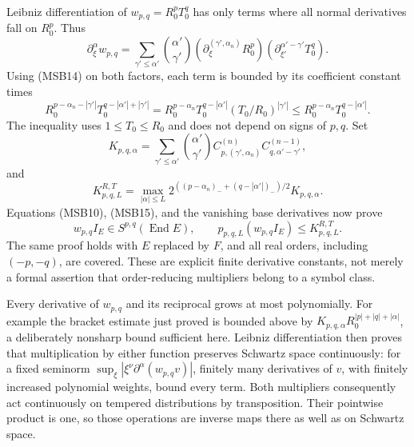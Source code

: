 \documentclass[
  11pt,
]{article}
\makeatletter
\let\ReaderOriginalAnchorStart\hyper@anchorstart
\let\ReaderOriginalAnchorEnd\hyper@anchorend
\let\ReaderPendingAliases\@empty
\def\ReaderArmAliases#1{\gdef\ReaderPendingAliases{#1}}
\def\hyper@anchorstart#1{\ReaderIfNativeAnchorTF{#1}{\ReaderPendingAliases\global\let\ReaderPendingAliases\@empty}{}\ReaderOriginalAnchorStart{#1}}
\makeatother
\begin{document}
Leibniz differentiation of \(w_{p,q}=R_0^pT_0^q\) has only terms where
all normal derivatives fall on \(R_0^p\). Thus \[
 \partial_\xi^\alpha w_{p,q}
 =\sum_{\gamma'\leq\alpha'}
    \binom{\alpha'}{\gamma'}
    (\partial_\xi^{(\gamma',\alpha_n)}R_0^p)
    (\partial_{\xi'}^{\alpha'-\gamma'}T_0^q).
 \tag{MSB15}
\] Using (MSB14) on both factors, each term is bounded by its
coefficient constant times \[
 R_0^{p-\alpha_n-|\gamma'|}
 T_0^{q-|\alpha'|+|\gamma'|}
 =R_0^{p-\alpha_n}T_0^{q-|\alpha'|}
       (T_0/R_0)^{|\gamma'|}
 \leq R_0^{p-\alpha_n}T_0^{q-|\alpha'|}.
\] The inequality uses \(1\leq T_0\leq R_0\) and does not depend on
signs of \(p,q\). Set \[
 K_{p,q,\alpha}=
 \sum_{\gamma'\leq\alpha'}\binom{\alpha'}{\gamma'}
 C^{(n)}_{p,(\gamma',\alpha_n)}
 C^{(n-1)}_{q,\alpha'-\gamma'},
\] and \[
 K_{p,q,L}^{R,T}=
 \max_{|\alpha|\leq L}
 2^{((p-\alpha_n)_-+(q-|\alpha'|)_-)/2}K_{p,q,\alpha}.
 \tag{MSB16}
\] Equations (MSB10), (MSB15), and the vanishing base derivatives now
prove \[
 w_{p,q}I_E\in S^{p,q}(\operatorname{End}E),
 \qquad p_{p,q,L}(w_{p,q}I_E)\leq K_{p,q,L}^{R,T}.
 \tag{MSB17}
\] The same proof holds with \(E\) replaced by \(F\), and all real
orders, including \((-p,-q)\), are covered. These are explicit finite
derivative constants, not merely a formal assertion that order-reducing
multipliers belong to a symbol class.

Every derivative of \(w_{p,q}\) and its reciprocal grows at most
polynomially. For example the bracket estimate just proved is bounded
above by \(K_{p,q,\alpha}R_0^{|p|+|q|+|\alpha|}\), a deliberately
nonsharp bound sufficient here. Leibniz differentiation then proves that
multiplication by either function preserves Schwartz space continuously:
for a fixed seminorm \(\sup_\xi|\xi^\nu\partial^\alpha(w_{p,q}v)|\),
finitely many derivatives of \(v\), with finitely increased polynomial
weights, bound every term. Both multipliers consequently act
continuously on tempered distributions by transposition. Their pointwise
product is one, so those operations are inverse maps there as well as on
Schwartz space.

\ReaderArmAliases{\ReaderOriginalAnchorStart{AN03-MSB-004}\ReaderOriginalAnchorEnd\begingroup\expandafter\def\csname @currentHref\endcsname{AN03-MSB-004}\label{AN03-MSB-004}\endgroup\ReaderOriginalAnchorStart{an03-msb-004-hilbert-spaces-exact-multiplier-domains-and-density}\ReaderOriginalAnchorEnd\begingroup\expandafter\def\csname @currentHref\endcsname{an03-msb-004-hilbert-spaces-exact-multiplier-domains-and-density}\label{an03-msb-004-hilbert-spaces-exact-multiplier-domains-and-density}\endgroup\ReaderOriginalAnchorStart{4-hilbert-spaces-exact-multiplier-domains-and-density}\ReaderOriginalAnchorEnd\begingroup\expandafter\def\csname @currentHref\endcsname{4-hilbert-spaces-exact-multiplier-domains-and-density}\label{4-hilbert-spaces-exact-multiplier-domains-and-density}\endgroup}
\end{document}
